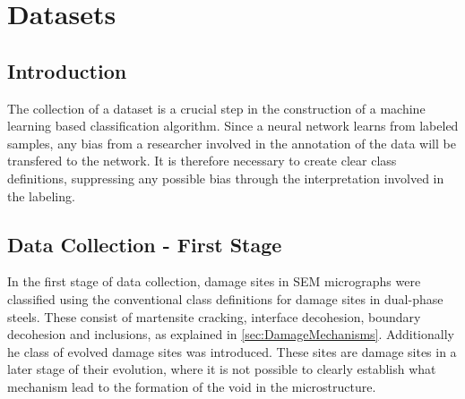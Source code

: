 \chapter{Datasets}


\section{Introduction}

The collection of a dataset is a crucial step in the construction of a machine learning based classification algorithm. Since a neural network learns from labeled samples, any bias from a researcher involved in the annotation of the data will be transfered to the network. It is therefore necessary to create clear class definitions, suppressing any possible bias through the interpretation involved in the labeling. \\




\section{Data Collection - First Stage}
In the first stage of data collection, damage sites in SEM micrographs were classified using the conventional class definitions for damage sites in dual-phase steels. These consist of martensite cracking, interface decohesion, boundary decohesion and inclusions, as explained in \ref{sec:DamageMechanisms}. Additionally he class of evolved damage sites was introduced. These sites are damage sites in a later stage of their evolution, where it is not possible to clearly establish what mechanism lead to the formation of the void in the microstructure. \\



